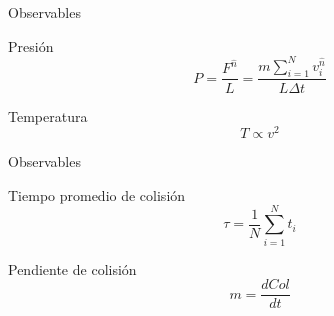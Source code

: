 \begin{frame}{Observables}
    \begin{block}{Presión}
        \begin{equation*}
            P = \frac{F^{\hat{n}}}{L} = \frac{m \sum_{i=1}^{N} v_{i}^{\hat{n}}}{L \Delta t}
        \end{equation*}
    \end{block}

    \begin{block}{Temperatura}
        \begin{equation*}
            T \propto v^{2}
        \end{equation*}
    \end{block}
\end{frame}

\begin{frame}{Observables}
    \begin{block}{Tiempo promedio de colisión}
        \begin{equation*}
            \tau = \frac{1}{N} \sum_{i=1}^{N} t_i
        \end{equation*}
    \end{block}

    \begin{block}{Pendiente de colisión}
        \begin{equation*}
            m = \frac{dCol}{dt}
        \end{equation*}
    \end{block}
\end{frame}

